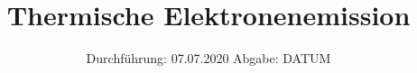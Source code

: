 

\subject{504}
\title{Thermische Elektronenemission}
\date{%
  Durchführung: 07.07.2020
  \hspace{3em}
  Abgabe: DATUM
}



\maketitle
\thispagestyle{empty}
\tableofcontents
\newpage






\nocite{V504}
\printbibliography{}


